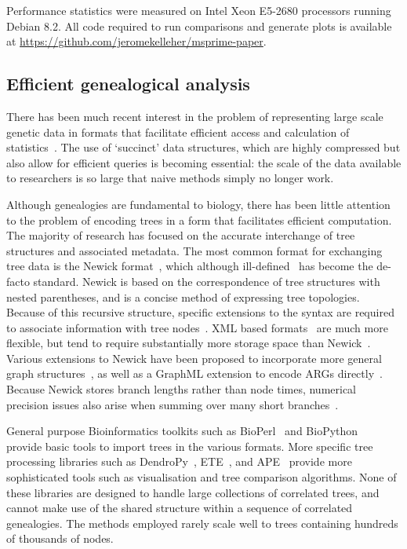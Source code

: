 \documentclass[10pt,letterpaper]{article}
\begin{document}
Performance statistics were measured on Intel Xeon E5-2680 processors
running Debian 8.2. All code required to run comparisons and
generate plots is available at
\url{https://github.com/jeromekelleher/msprime-paper}.

\subsection*{Efficient genealogical analysis}
\label{sec-analysis}

There has been much recent interest in the problem of representing large scale
genetic data in formats that facilitate efficient access and calculation of
statistics~\citep{d14,lkkq15,l15}. The use of
`succinct' data structures, which are highly compressed but also allow for
efficient queries is becoming essential: the scale of the data available to
researchers is so large that naive methods simply no longer work.

Although genealogies are fundamental to biology, there has been little
attention to the problem of encoding trees in a form that facilitates efficient
computation. The majority of research has focused on the accurate interchange
of tree structures and associated metadata.  The most common format for
exchanging tree data is the Newick format~\citep{f89}, which although
ill-defined~\citep{vbch12} has become the de-facto standard. Newick is based on
the correspondence of tree structures with nested parentheses, and is a concise
method of expressing tree topologies.  Because of this recursive structure,
specific extensions to the syntax are required to associate information with
tree nodes~\citep{msm97,ze01}. XML based formats~\citep{hz09,vbch12} are much
more flexible, but tend to require substantially more storage space than
Newick~\citep{vbch12}.  Various extensions to Newick have been proposed to
incorporate more general graph structures~\citep{mm06,bn06,crv08,trn08},
as well as a GraphML extension to encode ARGs directly~\citep{mwk13}.
Because Newick stores branch lengths rather than node times, numerical
precision issues also arise when summing over many short branches~\citep{mwk13}.

General purpose Bioinformatics toolkits such as BioPerl~\citep{sbbb10} and
BioPython~\citep{cacc09} provide basic tools to import trees in the various
formats. More specific tree processing libraries such as DendroPy~\citep{sh10},
ETE~\citep{hdg10}, and APE~\citep{pcs04} provide more sophisticated tools such
as visualisation and tree comparison algorithms. None of these libraries are
designed to handle large collections of correlated trees, and cannot make use
of the shared structure within a sequence of correlated genealogies. The
methods employed rarely scale well to trees containing hundreds of thousands of
nodes.
\end{document}

